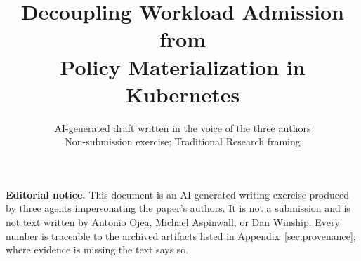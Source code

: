 \documentclass[letterpaper,twocolumn,10pt]{article}
\title{\Large\bf Decoupling Workload Admission from\\
Policy Materialization in Kubernetes}
\author{AI-generated draft written in the voice of the three authors\\
Non-submission exercise; Traditional Research framing}
\date{}
\begin{document}
\maketitle
\noindent\textbf{Editorial notice.} This document is an AI-generated writing
exercise produced by three agents impersonating the paper's authors. It is
not a submission and is not text written by Antonio Ojea, Michael Aspinwall,
or Dan Winship. Every number is traceable to the archived artifacts listed in
Appendix~\ref{sec:provenance}; where evidence is missing the text says so.






\clearpage



\clearpage
\appendix

\end{document}
